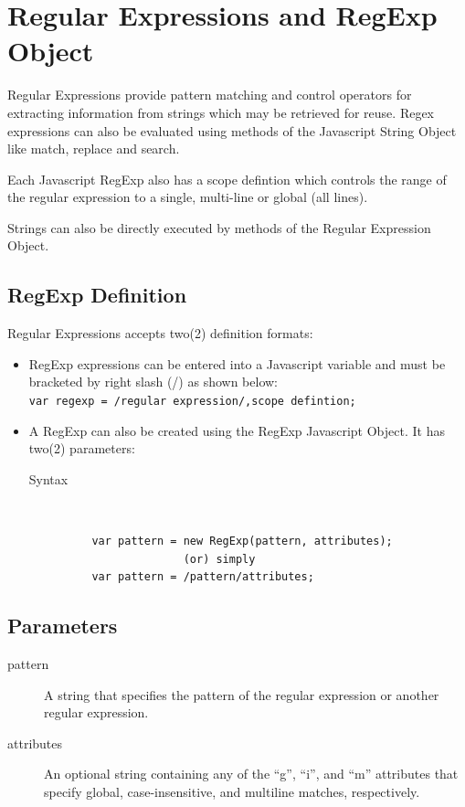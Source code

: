 \documentclass[11pt,a4paper]{article}
\author{TalentSprint}
\date{}
\begin{document}
\section*{Regular Expressions and RegExp Object}

Regular Expressions provide pattern matching and control operators for extracting information from strings which may be retrieved for reuse. Regex expressions can also be evaluated using methods of the Javascript String Object like match, replace and search. 

Each Javascript RegExp also has a scope defintion which controls the range of the regular expression to a single, multi-line or global (all lines).

Strings can also be directly executed by methods of the Regular Expression Object.

\subsection*{RegExp Definition}

Regular Expressions accepts two(2) definition formats:

\begin{itemize}

\item RegExp expressions can be entered into a Javascript variable and must be bracketed by right slash (/) as shown below:\\

\hspace{1cm}\texttt{var regexp = /regular expression/,scope defintion;}

\item A RegExp can also be created using the RegExp Javascript Object. 
   It has two(2) parameters:

\begin{description}
\item[Syntax]\

\begin{verbatim}
    var pattern = new RegExp(pattern, attributes);
                  (or) simply
    var pattern = /pattern/attributes;
\end{verbatim}
\end{description}
\end{itemize}

\subsection*{Parameters}
\begin{description}
\item[pattern] A string that specifies the pattern of the regular expression or another regular expression.
\item[attributes] An optional string containing any of the ``g'', ``i'', and ``m'' attributes that specify global, case-insensitive, and multiline matches, respectively.
\end{description}
\end{document}
